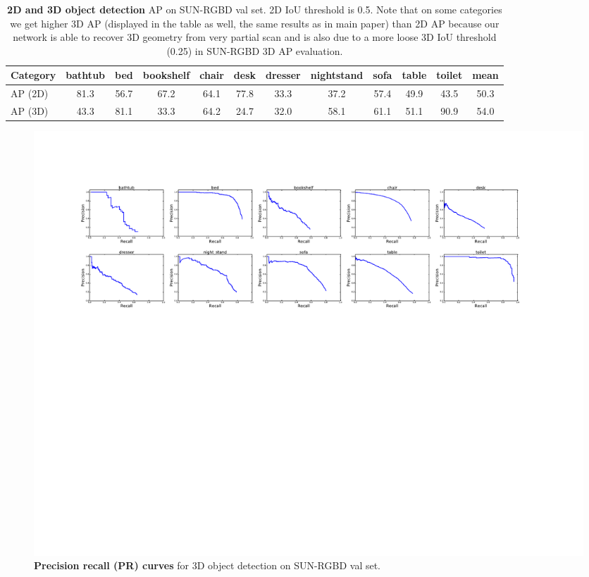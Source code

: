 
\begin{table}[]
    \centering
    \begin{tabular}{l|cccccccccc|c}
    \hline
    Category & bathtub & bed & bookshelf & chair & desk & dresser & nightstand & sofa & table & toilet & mean \\ \hline
         AP (2D) & 81.3 & 56.7 & 67.2 & 64.1 & 77.8 & 33.3 & 37.2 & 57.4 & 49.9 & 43.5 & 50.3 \\ \hline
         AP (3D) & 43.3 & 81.1 & 33.3 & 64.2 & 24.7 & 32.0 & 58.1 & 61.1 & 51.1 & 90.9 & 54.0 \\ \hline
    \end{tabular}
    \caption{\textbf{2D and 3D object detection} AP on SUN-RGBD val set. 2D IoU threshold is 0.5. Note that on some categories we get higher 3D AP (displayed in the table as well, the same results as in main paper) than 2D AP because our network is able to recover 3D geometry from very partial scan and is also due to a more loose 3D IoU threshold (0.25) in SUN-RGBD 3D AP evaluation.}
    \label{tab:my_label}
\end{table}


\begin{figure}[t!]
    \centering
    \includegraphics[width=\linewidth]{./fig/sunrgbd_3dap}
    \caption{\textbf{Precision recall (PR) curves} for 3D object detection on SUN-RGBD val set.}
    \label{fig:sunrgbd_ap}
\end{figure}



